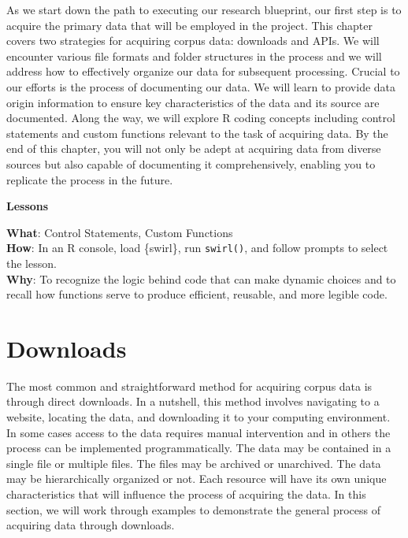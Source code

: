\documentclass[
  letterpaper,
  krantz1]{latex/krantz-mod}
\theoremstyle{definition}
\theoremstyle{definition}
\theoremstyle{remark}
\begin{document}
As we start down the path to executing our research blueprint, our first
step is to acquire the primary data that will be employed in the
project. This chapter covers two strategies for acquiring corpus data:
downloads and APIs. We will encounter various file formats and folder
structures in the process and we will address how to effectively
organize our data for subsequent processing. Crucial to our efforts is
the process of documenting our data. We will learn to provide data
origin information to ensure key characteristics of the data and its
source are documented. Along the way, we will explore R coding concepts
including control statements and custom functions relevant to the task
of acquiring data. By the end of this chapter, you will not only be
adept at acquiring data from diverse sources but also capable of
documenting it comprehensively, enabling you to replicate the process in
the future.

\begin{tcolorbox}[enhanced jigsaw, toprule=.15mm, breakable, colback=white, arc=.35mm, left=2mm, colframe=quarto-callout-color-frame, opacityback=0, bottomrule=.15mm, rightrule=.15mm, leftrule=.75mm]

\textbf{ Lessons}

\textbf{What}: Control Statements, Custom Functions\\
\textbf{How}: In an R console, load \{swirl\}, run \texttt{swirl()}, and
follow prompts to select the lesson.\\
\textbf{Why}: To recognize the logic behind code that can make dynamic
choices and to recall how functions serve to produce efficient,
reusable, and more legible code.

\end{tcolorbox}

\section{Downloads}\label{sec-downloads}

The most common and straightforward method for acquiring corpus data is
through direct downloads. In a nutshell, this method involves navigating
to a website, locating the data, and downloading it to your computing
environment. In some cases access to the data requires manual
intervention and in others the process can be implemented
programmatically. The data may be contained in a single file or multiple
files. The files may be archived or unarchived. The data may be
hierarchically organized or not. Each resource will have its own unique
characteristics that will influence the process of acquiring the data.
In this section, we will work through examples to demonstrate the
general process of acquiring data through downloads.
\end{document}
